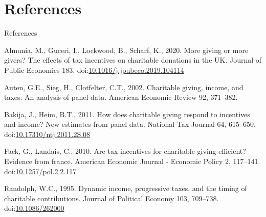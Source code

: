 \documentclass[
  ignorenonframetext,
  aspectratio=169]{beamer}
\newlength{\cslhangindent}
\newlength{\cslentryspacingunit} %
\newenvironment{CSLReferences}[2] %
 {%
  \setlength{\parindent}{0pt}
  \ifodd #1
  \let\oldpar\par
  \def\par{\hangindent=\cslhangindent\oldpar}
  \fi
  \setlength{\parskip}{#2\cslentryspacingunit}
 }%
 {}
\begin{document}
\hypertarget{references}{%
\section*{References}\label{references}}

\begin{frame}[allowframebreaks]{References}
\hypertarget{refs}{}
\begin{CSLReferences}{1}{0}
\leavevmode\hypertarget{ref-Almunia2020}{}%
Almunia, M., Guceri, I., Lockwood, B., Scharf, K., 2020. More giving or more givers? The effects of tax incentives on charitable donations in the UK. Journal of Public Economics 183. doi:\href{https://doi.org/10.1016/j.jpubeco.2019.104114}{10.1016/j.jpubeco.2019.104114}

\leavevmode\hypertarget{ref-Auten2002}{}%
Auten, G.E., Sieg, H., Clotfelter, C.T., 2002. Charitable giving, income, and taxes: An analysis of panel data. American Economic Review 92, 371--382.

\leavevmode\hypertarget{ref-Bakija2011}{}%
Bakija, J., Heim, B.T., 2011. How does charitable giving respond to incentives and income? New estimates from panel data. National Tax Journal 64, 615--650. doi:\href{https://doi.org/10.17310/ntj.2011.2S.08}{10.17310/ntj.2011.2S.08}

\leavevmode\hypertarget{ref-Fack2010}{}%
Fack, G., Landais, C., 2010. Are tax incentives for charitable giving efficient? Evidence from france. American Economic Journal - Economic Policy 2, 117--141. doi:\href{https://doi.org/10.1257/pol.2.2.117}{10.1257/pol.2.2.117}

\leavevmode\hypertarget{ref-Randolph1995}{}%
Randolph, W.C., 1995. Dynamic income, progressive taxes, and the timing of charitable contributions. Journal of Political Economy 103, 709--738. doi:\href{https://doi.org/10.1086/262000}{10.1086/262000}

\end{CSLReferences}
\end{frame}
\end{document}
